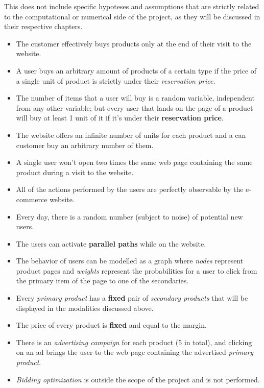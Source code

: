 This does not include specific hypoteses and assumptions that are strictly related to the computational or numerical side of the project, as they will be discussed in their respective chapters.

\begin{itemize}
    \item The customer effectively buys products only at the end of their visit to the website.
    \item A user buys an arbitrary amount of products of a certain type if the price of a single unit of product is strictly under their \textit{reservation price}.
    \item The number of items that a user will buy is a random variable, independent from any other variable; but every user that lands on the page of a product will buy at least 1 unit of it if it's under their \textbf{reservation price}.
    \item The website offers an infinite number of units for each product and a can customer buy an arbitrary number of them.
    \item A single user won't open two times the same web page containing the same product during a visit to the website.
    \item All of the actions performed by the users are perfectly observable by the e-commerce website.
    \item Every day, there is a random number (subject to noise) of potential new users.
    \item The users can activate \textbf{parallel paths} while on the website.
    \item The behavior of users can be modelled as a graph where \textit{nodes} represent product pages and \textit{weights} represent the probabilities for a user to click from the primary item of the page to one of the secondaries.
    \item Every \textit{primary product} has a \textbf{fixed} pair of \textit{secondary products} that will be displayed in the modalities discussed above.
    \item The price of every product is \textbf{fixed} and equal to the margin.
    \item There is an \textit{advertising campaign} for each product (5 in total), and clicking on an ad brings the user to the web page containing the advertised \textit{primary product}.
    \item \textit{Bidding optimization} is outside the scope of the project and is not performed.
\end{itemize}

